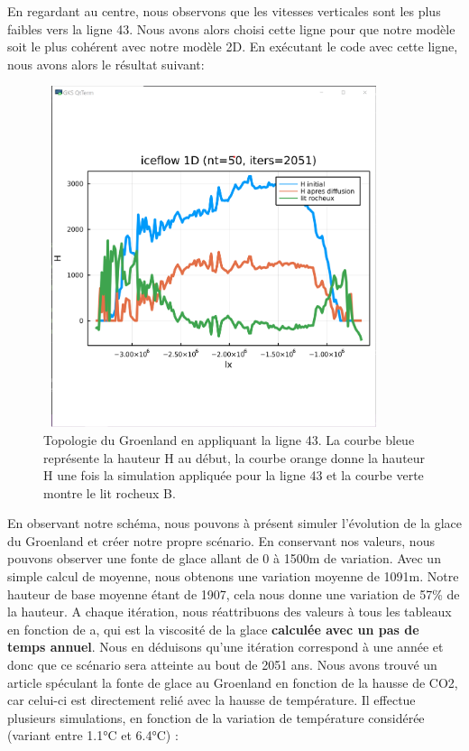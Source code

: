 \documentclass{article}
\begin{document}
\newline
 En regardant au centre, nous observons que les vitesses verticales sont les plus faibles vers la ligne 43. Nous avons alors choisi cette ligne pour que notre modèle soit le plus cohérent avec notre modèle 2D. 
\newline
En exécutant le code avec cette ligne, nous avons alors le résultat suivant: 
\begin{figure}[!htpb]
\centering
\includegraphics[width=10cm, keepaspectratio=true, height=10cm]{ligne43.png}
\caption{Topologie du Groenland en appliquant la ligne 43. La courbe bleue  représente la hauteur H au début, la courbe orange donne la hauteur H une fois la simulation appliquée pour la ligne 43 et la courbe verte montre le lit rocheux B. }
\end{figure}
\newpage
En observant notre schéma, nous pouvons à présent simuler l'évolution de la glace du Groenland et créer notre propre scénario. En conservant nos valeurs, nous pouvons observer une fonte de glace allant de 0 à 1500m de variation. Avec un simple calcul de moyenne, nous obtenons une variation moyenne de 1091m. Notre hauteur de base moyenne étant de 1907, cela nous donne une variation de 57\% de la hauteur. A chaque itération, nous réattribuons des valeurs à tous les tableaux en fonction de a, qui est la viscosité de la glace \textbf{calculée avec un pas de temps annuel}. Nous en déduisons qu'une itération correspond à une année et donc que ce scénario sera atteinte au bout de 2051 ans. 
\newline
Nous avons trouvé un article \cite{charbit2008amount} spéculant la fonte de glace au Groenland en fonction de la hausse de CO2, car celui-ci est directement relié avec la hausse de température. Il effectue plusieurs simulations, en fonction de la variation de température considérée (variant entre 1.1°C et 6.4°C) : 
\end{document}
